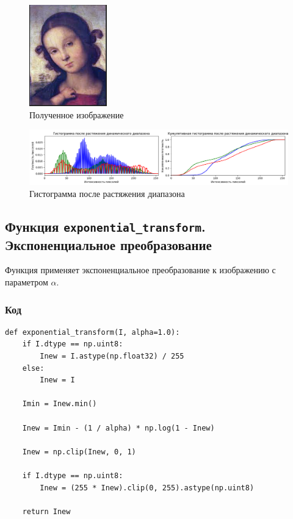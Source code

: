 \documentclass[a4paper,12pt]{article}
\begin{document}
\begin{figure}[H]
    \centering
    \includegraphics[width=0.3\textwidth]{im/imРастяжениеДиапазона.png}
    \caption{Полученное изображение}
    \label{fig:example_image}
\end{figure}
\begin{figure}[H]
    \centering
    \includegraphics[width=1\textwidth]{im/4.png}
    \caption{Гистограмма после растяжения диапазона}
    \label{fig:example_image}
\end{figure}


\subsection{Функция \texttt{exponential\_transform}. Экспоненциальное преобразование}

Функция применяет экспоненциальное преобразование к изображению с параметром \( \alpha \).

\subsubsection{Код}
\begin{verbatim}
def exponential_transform(I, alpha=1.0):
    if I.dtype == np.uint8:
        Inew = I.astype(np.float32) / 255
    else:
        Inew = I

    Imin = Inew.min()

    Inew = Imin - (1 / alpha) * np.log(1 - Inew)
    
    Inew = np.clip(Inew, 0, 1)
    
    if I.dtype == np.uint8:
        Inew = (255 * Inew).clip(0, 255).astype(np.uint8)
    
    return Inew
\end{verbatim}
\end{document}
